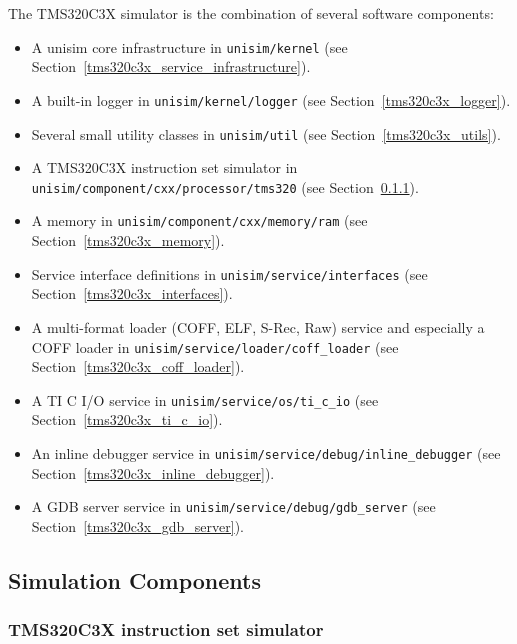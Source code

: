The TMS320C3X simulator is the combination of several software components:
\begin{itemize}
\item A unisim core infrastructure in \texttt{unisim/kernel} (see Section~\ref{tms320c3x_service_infrastructure}).
\item A built-in logger in \texttt{unisim/kernel/logger} (see Section~\ref{tms320c3x_logger}).
\item Several small utility classes in \texttt{unisim/util} (see Section~\ref{tms320c3x_utils}).
\item A TMS320C3X instruction set simulator in \texttt{unisim/component/cxx/processor/tms320} (see Section~\ref{tms320c3x_iss}).
\item A memory in \texttt{unisim/component/cxx/memory/ram} (see Section~\ref{tms320c3x_memory}).
\item Service interface definitions in \texttt{unisim/service/interfaces} (see Section~\ref{tms320c3x_interfaces}).
\item A multi-format loader (COFF, ELF, S-Rec, Raw) service and especially a COFF loader in \texttt{unisim/service/loader/coff\_loader} (see Section~\ref{tms320c3x_coff_loader}).
\item A TI C I/O service in \texttt{unisim/service/os/ti\_c\_io} (see Section~\ref{tms320c3x_ti_c_io}).
\item An inline debugger service in \texttt{unisim/service/debug/inline\_debugger} (see Section~\ref{tms320c3x_inline_debugger}).
\item A GDB server service in \texttt{unisim/service/debug/gdb\_server} (see Section~\ref{tms320c3x_gdb_server}).
\end{itemize}

\subsection{Simulation Components}

\subsubsection{TMS320C3X instruction set simulator}
\label{tms320c3x_iss}

